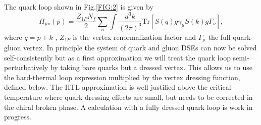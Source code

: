 \documentclass[a4paper,fleqn]{cls/cas-dc}
\begin{document}
The quark loop shown in Fig.\ref{FIG:2} is given by
\begin{equation}
	\Pi_{\mu \nu} (p) = \frac{Z_{1F} N_f}{2} \sum_n \int \frac{d^3 k}{(2 \pi)^3}\text{Tr}[S(q) g \gamma_\mu S(k) g \Gamma_\nu],
\end{equation}
where $q = p + k$ , $Z_{1F}$ is the vertex renormalization factor and $\Gamma_\mu$ the full quark-gluon vertex. In principle the system of
quark and gluon DSEs can now be solved self-consistently but as a first approximation we will treat the quark loop semi-
perturbatively by taking bare quarks but a dressed vertex. This allows us to use the hard-thermal loop expression multiplied
by the vertex dressing function, defined below. The HTL approximation is well justified above the critical temperature where
quark dressing effects are small, but needs to be corrected in the chiral broken phase. A calculation with a fully dressed quark
loop is work in progress.
\end{document}

